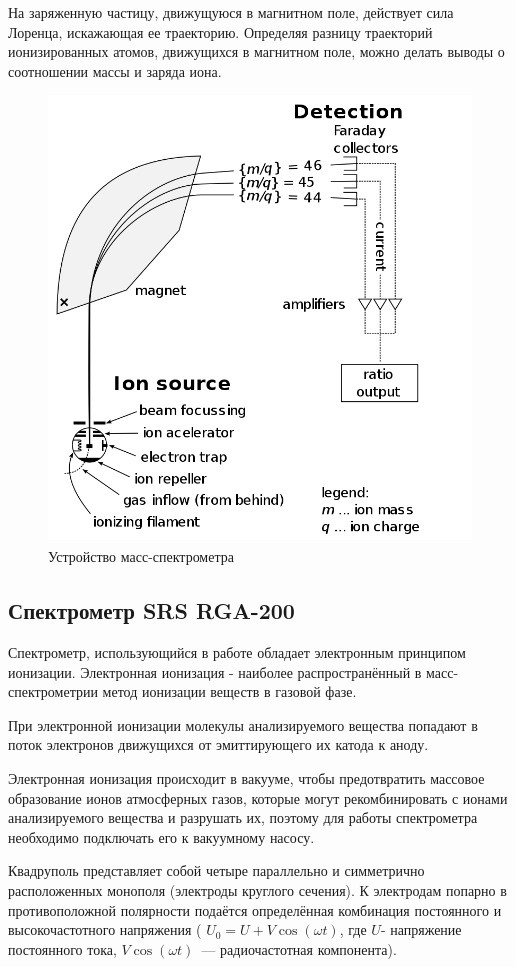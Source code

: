 \documentclass[a4paper,14pt]{extarticle}
\begin{document}
			На заряженную частицу, движущуюся в магнитном поле, действует сила Лоренца, искажающая ее траекторию. Определяя разницу траекторий ионизированных атомов, движущихся в магнитном поле, можно делать выводы о соотношении массы и заряда иона.
			
			\begin{figure}[h!]
				\centering
				\includegraphics[width=.55\linewidth]{Lab2_1.png}
				\caption{Устройство масс-спектрометра}
				\label{fig1}
			\end{figure}
		\subsection{Спектрометр SRS RGA-200}
			Спектрометр, использующийся в работе обладает электронным принципом ионизации.
			Электронная ионизация - наиболее распространённый в масс-спектрометрии метод ионизации веществ в газовой фазе.
			
			При электронной ионизации молекулы анализируемого вещества попадают в поток электронов движущихся от эмиттирующего их катода к аноду.
			
			Электронная ионизация происходит в вакууме, чтобы предотвратить массовое образование ионов атмосферных газов, которые могут рекомбинировать с ионами анализируемого вещества и разрушать их, поэтому для работы спектрометра необходимо подключать его к вакуумному насосу. 
			
			Квадруполь представляет собой четыре параллельно и симметрично расположенных монополя (электроды круглого сечения). К электродам попарно в противоположной полярности подаётся определённая комбинация постоянного и высокочастотного напряжения ( $U_0=U+V\cos(\omega t)$, где $U$- напряжение постоянного тока, $V \cos(\omega t)$ — радиочастотная компонента).
			
\end{document}
